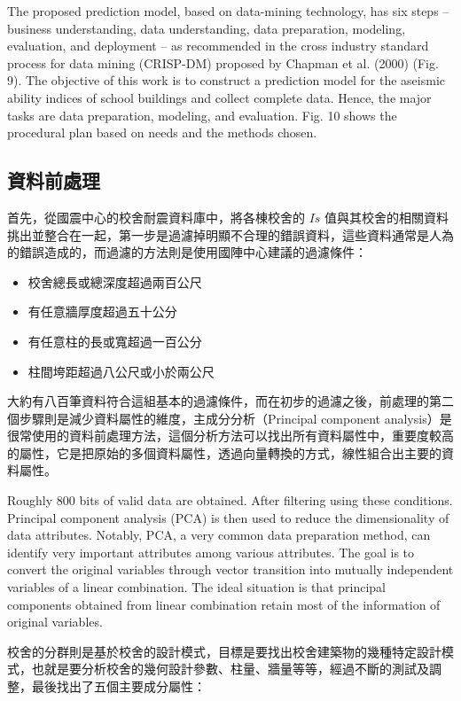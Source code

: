 The proposed prediction model, based on data-mining technology, has six steps – business understanding, data understanding, data preparation, modeling, evaluation, and deployment – as recommended in the cross industry standard process for data mining (CRISP-DM) proposed by Chapman et al. (2000) (Fig. 9). The objective of this work is to construct a prediction model for the aseismic ability indices of school buildings and collect complete data. Hence, the major tasks are data preparation, modeling, and evaluation. Fig. 10 shows the procedural plan based on needs and the methods chosen. 

\subsection{資料前處理}

首先，從國震中心的校舍耐震資料庫中，將各棟校舍的 $Is$ 值與其校舍的相關資料挑出並整合在一起，第一步是過濾掉明顯不合理的錯誤資料，這些資料通常是人為的錯誤造成的，而過濾的方法則是使用國陣中心建議的過濾條件：

\begin{itemize}
\item 校舍總長或總深度超過兩百公尺
\item 有任意牆厚度超過五十公分
\item 有任意柱的長或寬超過一百公分
\item 柱間垮距超過八公尺或小於兩公尺
\end{itemize}

大約有八百筆資料符合這組基本的過濾條件，而在初步的過濾之後，前處理的第二個步驟則是減少資料屬性的維度，主成分分析（Principal component analysis）是很常使用的資料前處理方法，這個分析方法可以找出所有資料屬性中，重要度較高的屬性，它是把原始的多個資料屬性，透過向量轉換的方式，線性組合出主要的資料屬性。

Roughly 800 bits of valid data are obtained. After filtering using these conditions. Principal component analysis (PCA) is then used to reduce the dimensionality of data attributes. Notably, PCA, a very common data preparation method, can identify very important attributes among various attributes. The goal is to convert the original variables through vector transition into mutually independent variables of a linear combination. The ideal situation is that principal components obtained from linear combination retain most of the information of original variables.

校舍的分群則是基於校舍的設計模式，目標是要找出校舍建築物的幾種特定設計模式，也就是要分析校舍的幾何設計參數、柱量、牆量等等，經過不斷的測試及調整，最後找出了五個主要成分屬性：

